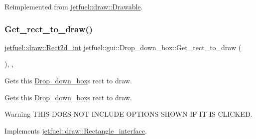 Reimplemented from \hyperlink{classjetfuel_1_1draw_1_1Drawable_ae7ebd30d66db2c8a5d5371cbcf0023fc}{jetfuel\+::draw\+::\+Drawable}.

\mbox{\label{classjetfuel_1_1gui_1_1Drop__down__box_ab07ac526f3c2e9930398d78c7cad2d52}} 
\subsubsection{\texorpdfstring{Get\+\_\+rect\+\_\+to\+\_\+draw()}{Get\_rect\_to\_draw()}}
{\footnotesize\ttfamily \hyperlink{classjetfuel_1_1draw_1_1Rect2d}{jetfuel\+::draw\+::\+Rect2d\+\_\+int} jetfuel\+::gui\+::\+Drop\+\_\+down\+\_\+box\+::\+Get\+\_\+rect\+\_\+to\+\_\+draw (\begin{DoxyParamCaption}{ }\end{DoxyParamCaption})\hspace{0.3cm}{\ttfamily [inline]}, {\ttfamily [override]}, {\ttfamily [virtual]}}



Gets this \hyperlink{classjetfuel_1_1gui_1_1Drop__down__box}{Drop\+\_\+down\+\_\+box}\textquotesingle{}s rect to draw. 

Gets this \hyperlink{classjetfuel_1_1gui_1_1Drop__down__box}{Drop\+\_\+down\+\_\+box}\textquotesingle{}s rect to draw.

\begin{DoxyWarning}{Warning}
T\+H\+IS D\+O\+ES N\+OT I\+N\+C\+L\+U\+DE O\+P\+T\+I\+O\+NS S\+H\+O\+WN IF IT IS C\+L\+I\+C\+K\+ED. 
\end{DoxyWarning}


Implements \hyperlink{classjetfuel_1_1draw_1_1Rectangle__interface_a03fd3b6842ab7b3065379caec407296f}{jetfuel\+::draw\+::\+Rectangle\+\_\+interface}.

\mbox{\label{classjetfuel_1_1gui_1_1Drop__down__box_ab8beac8ed8b442d96723f72a2fe9edb6}} 
